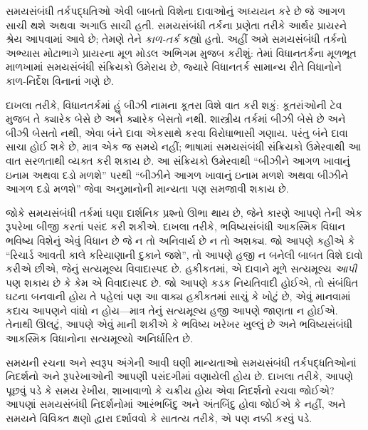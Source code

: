 \documentclass[../../../include/open-logic-section]{subfiles}
\begin{document}


સમયસંબંધી તર્કપદ્ધતિઓ એવી બાબતો વિશેના દાવાઓનું અધ્યયન કરે છે જે
આગળ સાચી થશે અથવા અગાઉ સાચી હતી. સમયસંબંધી તર્કના પ્રણેતા તરીકે
આર્થર પ્રાયરને શ્રેય આપવામાં આવે છે; તેમણે તેને \emph{કાળ-તર્ક}
કહ્યો હતો. અહીં અમે સમયસંબંધી તર્કનો અભ્યાસ મોટાભાગે પ્રાયરના મૂળ
મોડલ અભિગમ મુજબ કરીશું: તેમાં વિધાનતર્કના મૂળભૂત માળખામાં
સમયસંબંધી સંક્રિયકો ઉમેરાય છે, જ્યારે વિધાનતર્ક સામાન્ય રીતે
વિધાનોને કાળ-નિર્દેશ વિનાનાં ગણે છે.

દાખલા તરીકે, વિધાનતર્કમાં હું બીઝી નામના કૂતરા વિશે વાત કરી શકું:
કૂતરાંઓની ટેવ મુજબ તે ક્યારેક બેસે છે અને ક્યારેક બેસતો નથી.
શાસ્ત્રીય તર્કમાં બીઝી બેસે છે અને બીઝી બેસતો નથી, એવા બંને દાવા
એકસાથે કરવા વિરોધાભાસી ગણાય. પરંતુ બંને દાવા સાચા હોઈ શકે છે,
માત્ર એક જ સમયે નહીં; ભાષામાં સમયસંબંધી સંક્રિયકો ઉમેરવાથી આ વાત
સરળતાથી વ્યક્ત કરી શકાય છે. આ સંક્રિયકો ઉમેરવાથી ``બીઝીને આગળ
ખાવાનું ઇનામ અથવા દડો મળશે'' પરથી ``બીઝીને આગળ ખાવાનું ઇનામ
મળશે અથવા બીઝીને આગળ દડો મળશે'' જેવા અનુમાનોની માન્યતા પણ
સમજાવી શકાય છે.

જોકે સમયસંબંધી તર્કમાં ઘણા દાર્શનિક પ્રશ્નો ઊભા થાય છે, જેને કારણે
આપણે તેની એક રૂપરેખા બીજી કરતાં પસંદ કરી શકીએ. દાખલા તરીકે,
ભવિષ્યસંબંધી આકસ્મિક વિધાન ભવિષ્ય વિશેનું એવું વિધાન છે જે ન તો
અનિવાર્ય છે ન તો અશક્ય. જો આપણે કહીએ કે ``રિચાર્ડ આવતી કાલે
કરિયાણાની દુકાને જશે'', તો આપણે હજી ન બનેલી બાબત વિશે દાવો કરીએ
છીએ, જેનું સત્યમૂલ્ય વિવાદાસ્પદ છે. હકીકતમાં, એ દાવાને મૂળે
સત્યમૂલ્ય \emph{આપી} પણ શકાય છે કે કેમ એ વિવાદાસ્પદ છે. જો આપણે
કડક નિયતિવાદી હોઈએ, તો સંબંધિત ઘટના બનવાની હોય તે પહેલાં પણ આ
વાક્ય હકીકતમાં સાચું કે ખોટું છે, એવું માનવામાં કદાચ આપણને વાંધો
ન હોય---માત્ર તેનું સત્યમૂલ્ય હજી આપણે જાણતા ન હોઈએ. તેનાથી
ઊલટું, આપણે એવું માની શકીએ કે ભવિષ્ય ખરેખર ખુલ્લું છે અને
ભવિષ્યસંબંધી આકસ્મિક વિધાનોના સત્યમૂલ્યો અનિર્ધારિત છે.

સમયની રચના અને સ્વરૂપ અંગેની આવી ઘણી માન્યતાઓ સમયસંબંધી
તર્કપદ્ધતિઓનાં નિદર્શનો અને રૂપરેખાઓની આપણી પસંદગીમાં વણાયેલી હોય છે.
દાખલા તરીકે, આપણે પૂછવું પડે કે સમય રેખીય, શાખાવાળો કે ચક્રીય
હોય એવા નિદર્શનો રચવા જોઈએ? આપણાં સમયસંબંધી નિદર્શનોમાં આરંભબિંદુ અને
અંતબિંદુ હોવા જોઈએ કે નહીં, અને સમયને વિવિક્ત ક્ષણો દ્વારા
દર્શાવવો કે સાતત્ય તરીકે, એ પણ નક્કી કરવું પડે.
\end{document}

